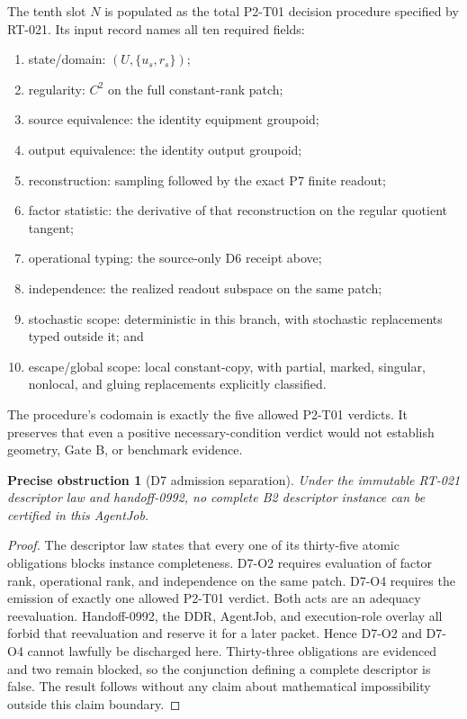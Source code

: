 \documentclass[11pt]{article}
\newtheorem{obstruction}{Precise obstruction}
\begin{document}
The tenth slot \(N\) is populated as the total P2-T01 decision procedure
specified by RT-021. Its input record names all ten required fields:
\begin{enumerate}[leftmargin=*]
\item state/domain: \((U,\{u_s,r_s\})\);
\item regularity: \(C^2\) on the full constant-rank patch;
\item source equivalence: the identity equipment groupoid;
\item output equivalence: the identity output groupoid;
\item reconstruction: sampling followed by the exact P7 finite readout;
\item factor statistic: the derivative of that reconstruction on the regular
  quotient tangent;
\item operational typing: the source-only D6 receipt above;
\item independence: the realized readout subspace on the same patch;
\item stochastic scope: deterministic in this branch, with stochastic
  replacements typed outside it; and
\item escape/global scope: local constant-copy, with partial, marked,
  singular, nonlocal, and gluing replacements explicitly classified.
\end{enumerate}
The procedure's codomain is exactly the five allowed P2-T01 verdicts. It
preserves that even a positive necessary-condition verdict would not establish
geometry, Gate B, or benchmark evidence.

\begin{obstruction}[D7 admission separation]
\label{obst:d7}
Under the immutable RT-021 descriptor law and handoff-0992, no complete B2
descriptor instance can be certified in this AgentJob.
\end{obstruction}

\begin{proof}
The descriptor law states that every one of its thirty-five atomic
obligations blocks instance completeness. D7-O2 requires evaluation of factor
rank, operational rank, and independence on the same patch. D7-O4 requires
the emission of exactly one allowed P2-T01 verdict. Both acts are an adequacy
reevaluation. Handoff-0992, the DDR, AgentJob, and execution-role overlay all
forbid that reevaluation and reserve it for a later packet. Hence D7-O2 and
D7-O4 cannot lawfully be discharged here. Thirty-three obligations are
evidenced and two remain blocked, so the conjunction defining a complete
descriptor is false. The result follows without any claim about mathematical
impossibility outside this claim boundary.
\end{proof}
\end{document}
